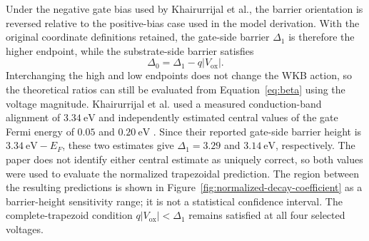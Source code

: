 \documentclass[12pt]{article}
\begin{document}
Under the negative gate bias used by Khairurrijal et al., the barrier orientation is reversed relative to the positive-bias case used in the model derivation. With the original coordinate definitions retained, the gate-side barrier \(\Delta_1\) is therefore the higher endpoint, while the substrate-side barrier satisfies
\[
    \Delta_0=\Delta_1-q\lvert V_{\mathrm{ox}}\rvert.
\]
Interchanging the high and low endpoints does not change the WKB action, so the theoretical ratios can still be evaluated from Equation~\eqref{eq:beta} using the voltage magnitude. Khairurrijal et al. used a measured conduction-band alignment of \(3.34~\mathrm{eV}\) and independently estimated central values of the gate Fermi energy of \(0.05\) and \(0.20~\mathrm{eV}\) \cite{khairurrijal2000}. Since their reported gate-side barrier height is \(3.34~\mathrm{eV}-E_F\), these two estimates give \(\Delta_1=3.29\) and \(3.14~\mathrm{eV}\), respectively. The paper does not identify either central estimate as uniquely correct, so both values were used to evaluate the normalized trapezoidal prediction. The region between the resulting predictions is shown in Figure~\ref{fig:normalized-decay-coefficient} as a barrier-height sensitivity range; it is not a statistical confidence interval. The complete-trapezoid condition \(q\lvert V_{\mathrm{ox}}\rvert<\Delta_1\) remains satisfied at all four selected voltages.
\end{document}
